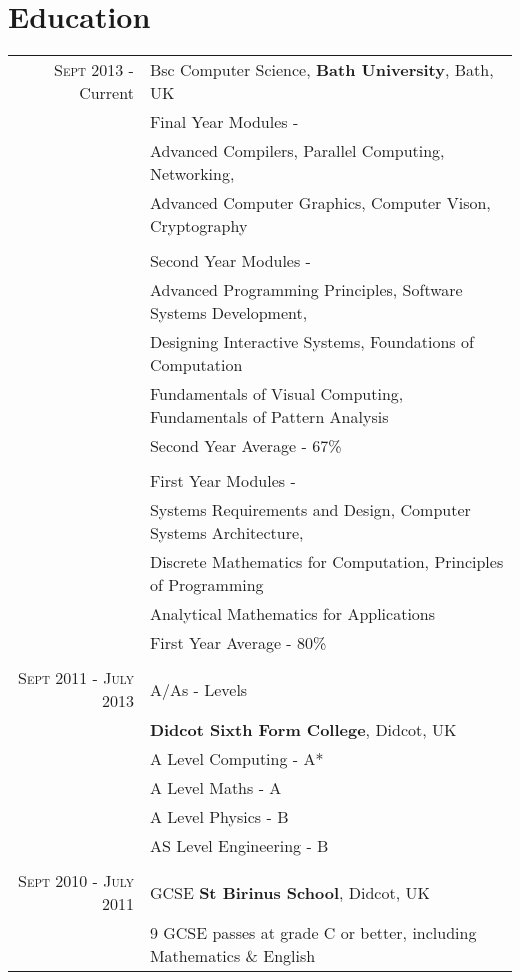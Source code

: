 \documentclass[a4paper,10pt]{article}
\begin{document}
\section{Education}
\begin{tabular}{rl}
 \textsc{Sept} 2013 - Current & Bsc Computer Science, \textbf{Bath University}, Bath, UK\\
& Final Year Modules -\\
& \hspace{0.25cm} Advanced Compilers, Parallel Computing, Networking, \\ & \hspace{0.25cm} Advanced Computer Graphics, Computer Vison, Cryptography\\
& \\
& Second Year Modules -\\
& \hspace{0.25cm} Advanced Programming Principles, Software Systems Development, \\ & \hspace{0.25cm} Designing Interactive Systems, Foundations of Computation \\ & \hspace{0.25cm} Fundamentals of Visual Computing, Fundamentals of Pattern Analysis\\
& Second Year Average - 67\%\\
& \\
& First Year Modules -\\
& \hspace{0.25cm} Systems Requirements and Design, Computer Systems Architecture, \\ & \hspace{0.25cm} Discrete Mathematics for Computation, Principles of Programming\\ & \hspace{0.25cm} Analytical Mathematics for Applications\\
& First Year Average - 80\%\\
& \\
\textsc{Sept} 2011 - \textsc{July} 2013 & A/As - Levels \\& \normalsize\textbf{Didcot Sixth Form College}, Didcot, UK\\
& A Level Computing - A*\\
& A Level Maths - A\\
& A Level Physics - B\\
& AS Level Engineering - B\\&\\
\textsc{Sept} 2010 - \textsc{July} 2011& GCSE \textbf{St Birinus School}, Didcot, UK\\
&9 GCSE passes at grade C or better, including Mathematics \& English \\
\end{tabular}
\end{document}
